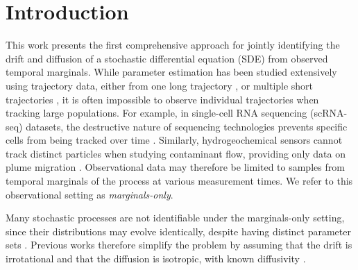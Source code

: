 \documentclass[twoside,11pt]{article}
\begin{document}
\section{Introduction}
This work presents the first comprehensive approach for jointly identifying the drift and diffusion of a stochastic differential equation (SDE) from observed temporal marginals. While parameter estimation has been studied extensively using trajectory data, either from one long trajectory \citep{nielsen2000parameter, bishwal2007parameter}, or multiple short trajectories \citep{manten2024signature, lu2021learning, pawlowicz2019lagrangian}, it is often impossible to observe individual trajectories when tracking large populations. For example, in single-cell RNA sequencing (scRNA-seq) datasets, the destructive nature of sequencing technologies prevents specific cells from being tracked over time \citep{trapnell2014dynamics, setty2016wishbone, farrell2018single}. Similarly, hydrogeochemical sensors cannot track distinct particles when studying contaminant flow, providing only data on plume migration \citep{man2007stochastic, hazas2023evolution,salamon2007modeling,elfeki2006prediction,adams1992field,boggs1992field,mackay1986natural,nenna2011application}. Observational data may therefore be limited to samples from temporal marginals of the process at various measurement times. We refer to this observational setting as \textit{marginals-only}.

Many stochastic processes are not identifiable under the marginals-only setting, since their distributions may evolve identically, despite having distinct parameter sets \citep{weinreb2018fundamental}. Previous works therefore simplify the problem by assuming that the drift is irrotational and that the diffusion is isotropic, with known diffusivity \citep{weinreb2018fundamental, lavenant2021towards,vargas2021solving,chizat2022trajectory}.
\end{document}
